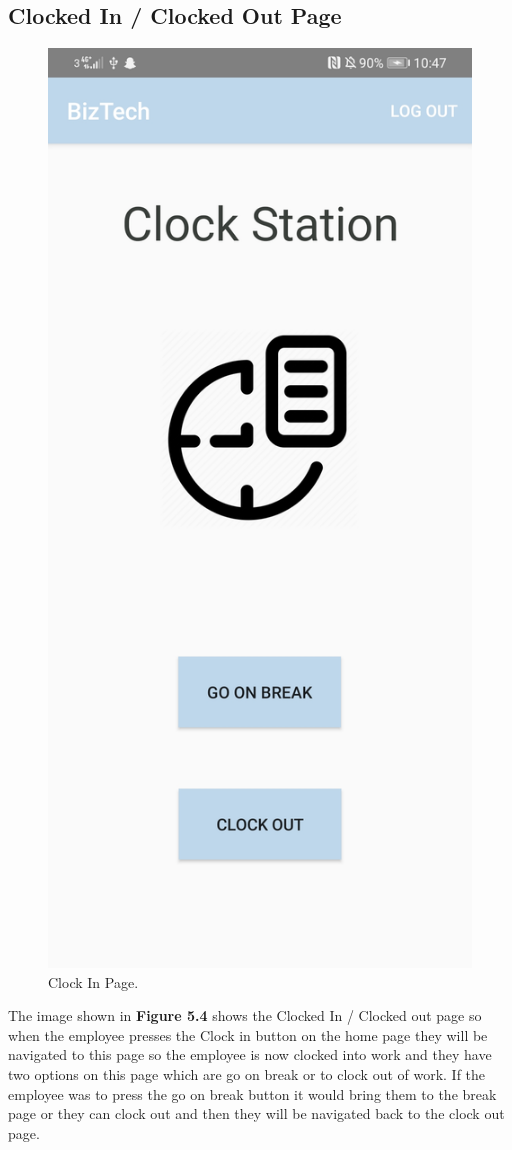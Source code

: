 \subsection{Clocked In / Clocked Out Page}
\begin{figure}[!htb]
    \centering
    \includegraphics[scale=0.15]{img/ClockedInPage2.jpg}
    \caption{Clock In Page.}
    \label{fig}
\end{figure}
The image shown in \textbf{Figure 5.4} shows the Clocked In / Clocked out page so when the employee presses the Clock in button on the home page they will be navigated to this page so the employee is now clocked into work and they have two options on this page which are go on break or to clock out of work. If the employee was to press the go on break button it would bring them to the break page or they can clock out and then they will be navigated back to the clock out page.
\FloatBarrier

